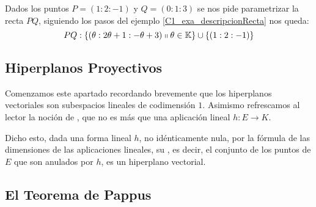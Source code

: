 \begin{exa}
	\label{C1_exa_rectaConcreta}
	Dados los puntos $P=(1:2:-1)$ y $Q=(0:1:3)$ se nos pide parametrizar la recta $PQ$, siguiendo los pasos del ejemplo \ref{C1_exa_descripcionRecta} nos queda:
	\[
	PQ:\{(\theta:2\theta+1:-\theta+3)\shortparallel\theta\in\mathbb{K}\}\cup\{(1:2:-1)\}
	\]
\end{exa}
\subsection{Hiperplanos Proyectivos}
Comenzamos este apartado recordando brevemente que los hiperplanos vectoriales son subespacios lineales de codimensión $1$. Asimismo refrescamos al lector la noción de , que no es más que una aplicación lineal $h:E\to K$.

Dicho esto, dada una forma lineal $h$, no idénticamente nula, por la fórmula de las dimensiones de las aplicaciones lineales, su , es decir, el conjunto de los puntos de $E$ que son anulados por $h$, es un hiperplano vectorial.


\subsection{El Teorema de Pappus}